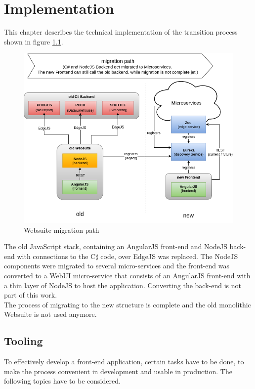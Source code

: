 
\chapter{Implementation}
This chapter describes the technical implementation of the transition process shown in figure \ref{fig:websuite-migration}.
\begin{figure}[H]
	\centering\includegraphics[width=1\textwidth]{res/Websuite_migration}
	\caption{Websuite migration path}
	\label{fig:websuite-migration}
\end{figure}

The old JavaScript stack, containing an AngularJS front-end and NodeJS back-end with connections to the C$\sharp$ code, over EdgeJS was replaced. The NodeJS components were migrated to several micro-services and the front-end was converted to a WebUI micro-service that consists of an AngularJS front-end with a thin layer of NodeJS to host the application. Converting the back-end is not part of this work.\\
The process of migrating to the new structure is complete and the old monolithic Websuite is not used anymore.



\section{Tooling}
To effectively develop a front-end application, certain tasks have to be done, to make the process convenient in development and usable in production. The following topics have to be considered.


